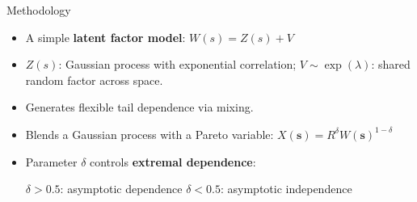 \documentclass[final]{beamer}
\newlength{\colwidth}
\begin{document}
\begin{frame}[t]
\begin{columns}[t]
\begin{column}{\colwidth}
\begin{block}{Methodology}
\vspace{-.3cm}
\vspace{-.3cm}
\begin{itemize}
  \item A simple \textbf{latent factor model}: $W(s) = Z(s) + V$
  \item \(Z(s)\): Gaussian process with exponential correlation;  
        \(V \sim \exp(\lambda)\): shared random factor across space.
  \item Generates flexible tail dependence via mixing.
\end{itemize}

\vspace{-.3cm}
\vspace{-.3cm}
\begin{itemize}
  \item Blends a Gaussian process with a Pareto variable: $X(\pmb{s}) = R^{\delta} W(\pmb{s})^{1-\delta}$
  \item Parameter \(\delta\) controls \textbf{extremal dependence}:
  
  \textbullet\hspace{.5em} \(\delta > 0.5\): asymptotic dependence \hspace{1cm} \textbullet\hspace{.5em} \(\delta < 0.5\): asymptotic independence
\end{itemize}

\vspace{-.3cm}


\end{block}
\end{column}
\end{columns}
\end{frame}
\end{document}
